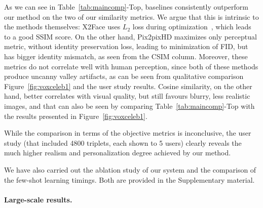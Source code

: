 \documentclass[10pt,twocolumn,letterpaper]{article}
\newcommand{\fig}[1]{Figure~\ref{fig:#1}}
\newcommand{\tab}[1]{Table~\ref{tab:#1}}
\begin{document}
As we can see in \tab{maincomp}-Top, baselines consistently outperform our method on the two of our similarity metrics. We argue that this is intrinsic to the methods themselves: X2Face uses $L_2$ loss during optimization~\cite{Wiles18}, which leads to a good SSIM score. On the other hand, Pix2pixHD maximizes only perceptual metric, without identity preservation loss, leading to minimization of FID, but has bigger identity mismatch, as seen from the CSIM column. Moreover, these metrics do not correlate well with human perception, since both of these methods produce uncanny valley artifacts, as can be seen from qualitative comparison \fig{voxceleb1} and the user study results. Cosine similarity, on the other hand, better correlates with visual quality, but still favours blurry, less realistic images, and that can also be seen by comparing \tab{maincomp}-Top with the results presented in \fig{voxceleb1}.

While the comparison in terms of the objective metrics is inconclusive, the user study (that included 4800 triplets, each shown to 5 users) clearly reveals the much higher realism and personalization degree achieved by our method.

We have also carried out the ablation study of our system and the comparison of the few-shot learning timings. Both are provided in the Supplementary material.

\paragraph{Large-scale results.}
\end{document}
